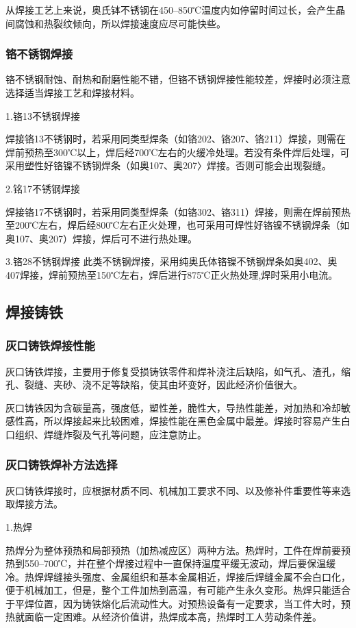 \documentclass{ctexbook}
\begin{document}
从焊接工艺上来说，奥氏钵不锈钢在450--850℃温度内如停留时间过长，会产生晶间腐蚀和热裂纹倾向，所以焊接速度应尽可能快些。
\subsubsection{铬不锈钢焊接}
铬不锈钢耐蚀、耐热和耐磨性能不错，但铬不锈钢焊接性能较差，焊接时必须注意选择适当焊接工艺和焊接材料。

1.铬13不锈钢焊接

焊接铬13不锈钢时，若采用同类型焊条（如铬202、铬207、铬211）焊接，则需在焊前预热至300℃以上，焊后经700℃左右的火缓冷处理。若没有条件焊后处理，可采用塑性好铬镍不锈钢焊条（如奥107、奥207〉焊接。否则可能会出现裂缝。

2.铭17不锈钢焊接

焊接铬17不锈钢时，若采用同类型焊条（如铬302、铬311）焊接，则需在焊前预热至200℃左右，焊后经800℃左右正火处理，也可采用可焊性好铬镍不锈钢焊条（如奥107、奥207）焊接，焊后可不进行热处理。

3.铬28不锈钢焊接
此类不锈钢焊接，采用纯奥氏体铬镍不锈钢焊条如奥402、奥407焊接，焊前预热至150℃左右，焊后进行875℃正火热处理,焊时采用小电流。
\subsection{焊接铸铁}
\subsubsection{灰口铸铁焊接性能}
灰口铸铁焊接，主要用于修复受损铸铁零件和焊补浇注后缺陷，如气孔、渣孔，缩孔、裂缝、夹砂、浇不足等缺陷，使其由坏变好，因此经济价值很大。

灰口铸铁因为含碳量高，强度低，塑性差，脆性大，导热性能差，对加热和冷却敏感性高，所以焊接起来比较困难，焊接性能在黑色金属中最差。焊接时容易产生白口组织、焊缝炸裂及气孔等问题，应注意防止。
\subsubsection{灰口铸铁焊补方法选择}
灰口铸铁焊接时，应根据材质不同、机械加工要求不同、以及修补件重要性等来选取焊接方法。

1.热焊

热焊分为整体预热和局部预热（加热减应区）两种方法。热焊时，工件在焊前要预热到550--700℃，并在整个焊接过程中一直保持温度平缓无波动，焊后要保温缓冷。热焊焊缝接头强度、金属组织和基本金属相近，焊接后焊缝金属不会白口化，便于机械加工，但是，整个工件加热到高温，有可能产生永久变形。热焊只能适合于平焊位置，因为铸铁熔化后流动性大。对预热设备有一定要求，当工件大时，预热就面临一定困难。从经济价值讲，热焊成本高，热焊时工人劳动条件差。
\end{document}
